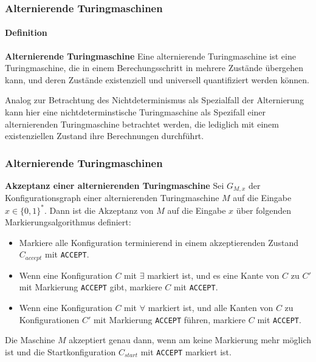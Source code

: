 \begin{frame}
    \frametitle{Alternierende Turingmaschinen}
    \framesubtitle{Definition}
    \begin{block}{\textbf{Alternierende Turingmaschine}}
        Eine alternierende Turingmaschine ist eine Turingmaschine, die in einem Berechungsschritt in mehrere Zustände übergehen kann,
        und deren Zustände existenziell und universell quantifiziert werden können.
    \end{block}
    Analog zur Betrachtung des Nichtdeterminismus als Spezialfall der Alternierung kann hier eine nichtdeterminstische Turingmaschine als Spezifall einer alternierenden
    Turingmaschine betrachtet werden, die lediglich mit einem existenziellen Zustand ihre Berechnungen durchführt.

\end{frame}

\begin{frame}
    \frametitle{Alternierende Turingmaschinen}
    \begin{block}{\textbf{Akzeptanz einer alternierenden Turingmaschine}}
        Sei $G_{M,x}$ der Konfigurationsgraph einer alternierenden Turingmaschine $M$ auf die Eingabe $x \in \{0, 1\}^*$.
        Dann ist die Akzeptanz von $M$ auf die Eingabe $x$ über folgenden Markierungsalgorithmus definiert:
        \begin{itemize}
            \item Markiere alle Konfiguration terminierend in einem akzeptierenden Zustand $C_{accept}$ mit \texttt{ACCEPT}.
            \item Wenn eine Konfiguration $C$ mit $\exists$ markiert ist, und es eine Kante von $C$ zu $C'$ mit
            Markierung \texttt{ACCEPT} gibt, markiere $C$ mit \texttt{ACCEPT}.
            \item Wenn eine Konfiguration $C$ mit $\forall$ markiert ist, und alle Kanten von $C$ zu
            Konfigurationen $C'$ mit Markierung \texttt{ACCEPT} führen, markiere $C$ mit \texttt{ACCEPT}.
        \end{itemize}
        Die Maschine $M$ akzeptiert genau dann, wenn am keine Markierung mehr möglich ist und die Startkonfiguration $C_{start}$ mit \texttt{ACCEPT}
        markiert ist.
    \end{block}

\end{frame}